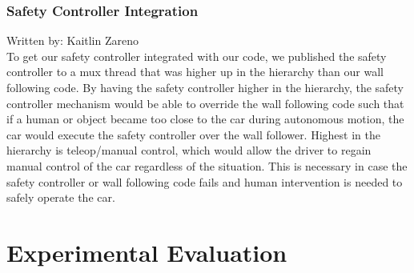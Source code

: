 \documentclass{article}
\begin{document}
\subsubsection{Safety Controller Integration}
Written by: Kaitlin Zareno\\

To get our safety controller integrated with our code, we published the safety controller to a mux thread that was higher up in the hierarchy than our wall following code. By having the safety controller higher in the hierarchy, the safety controller mechanism would be able to override the wall following code such that if a human or object became too close to the car during autonomous motion, the car would execute the safety controller over the wall follower. Highest in the hierarchy is teleop/manual control, which would allow the driver to regain manual control of the car regardless of the situation. This is necessary in case the safety controller or wall following code fails and human intervention is needed to safely operate the car.

\section{Experimental Evaluation}

\end{document}
